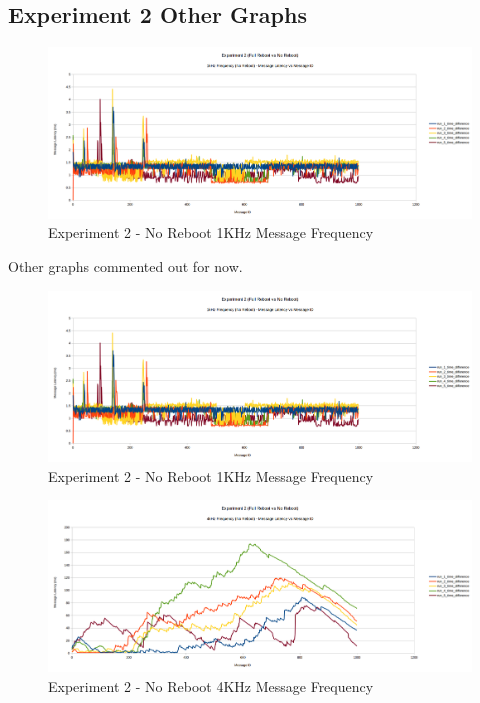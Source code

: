 \documentclass{l4proj}
\begin{document}






\begin{appendices}

\chapter{Experiment 2 Other Graphs}
\label{exp2-appendix-results}

\begin{figure}
\centering
\includegraphics[width=\textwidth]{images/no-reboot-1khz.png}
\caption{Experiment 2 - No Reboot 1KHz Message Frequency}
\label{exp2-noreboot-1khz}
\end{figure}
Other graphs commented out for now.
\iffalse
\begin{figure}
\centering
\includegraphics[width=\textwidth]{images/no-reboot-1khz.png}
\caption{Experiment 2 - No Reboot 1KHz Message Frequency}
\label{exp2-fullreboot-1khz}
\end{figure}

\begin{figure}
\centering
\includegraphics[width=\textwidth]{images/no-reboot-4khz.png}
\caption{Experiment 2 - No Reboot 4KHz Message Frequency}
\label{exp2-noreboot-4khz}
\end{figure}


\end{appendices}
\end{document}
